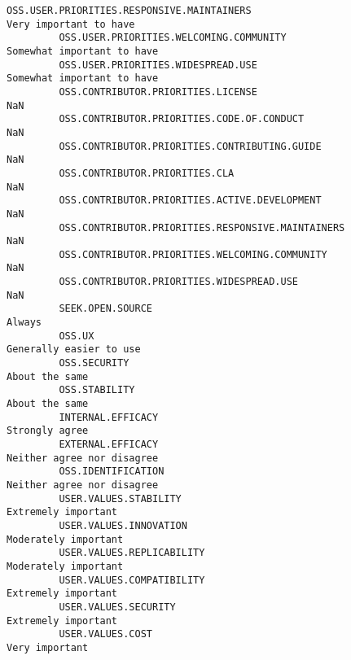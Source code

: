 \documentclass[11pt]{article}
\begin{document}
\begin{Verbatim}[commandchars=\\\{\}]
         OSS.USER.PRIORITIES.RESPONSIVE.MAINTAINERS                                    Very important to have  
         OSS.USER.PRIORITIES.WELCOMING.COMMUNITY                                   Somewhat important to have  
         OSS.USER.PRIORITIES.WIDESPREAD.USE                                        Somewhat important to have  
         OSS.CONTRIBUTOR.PRIORITIES.LICENSE                                                               NaN  
         OSS.CONTRIBUTOR.PRIORITIES.CODE.OF.CONDUCT                                                       NaN  
         OSS.CONTRIBUTOR.PRIORITIES.CONTRIBUTING.GUIDE                                                    NaN  
         OSS.CONTRIBUTOR.PRIORITIES.CLA                                                                   NaN  
         OSS.CONTRIBUTOR.PRIORITIES.ACTIVE.DEVELOPMENT                                                    NaN  
         OSS.CONTRIBUTOR.PRIORITIES.RESPONSIVE.MAINTAINERS                                                NaN  
         OSS.CONTRIBUTOR.PRIORITIES.WELCOMING.COMMUNITY                                                   NaN  
         OSS.CONTRIBUTOR.PRIORITIES.WIDESPREAD.USE                                                        NaN  
         SEEK.OPEN.SOURCE                                                                              Always  
         OSS.UX                                                                       Generally easier to use  
         OSS.SECURITY                                                                          About the same  
         OSS.STABILITY                                                                         About the same  
         INTERNAL.EFFICACY                                                                     Strongly agree  
         EXTERNAL.EFFICACY                                                         Neither agree nor disagree  
         OSS.IDENTIFICATION                                                        Neither agree nor disagree  
         USER.VALUES.STABILITY                                                            Extremely important  
         USER.VALUES.INNOVATION                                                          Moderately important  
         USER.VALUES.REPLICABILITY                                                       Moderately important  
         USER.VALUES.COMPATIBILITY                                                        Extremely important  
         USER.VALUES.SECURITY                                                             Extremely important  
         USER.VALUES.COST                                                                      Very important  

\end{Verbatim}
\end{document}
